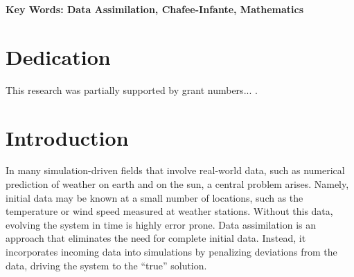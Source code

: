 \documentclass[12pt]{amsart}
\theoremstyle{plain}
\theoremstyle{definition}
\theoremstyle{remark}
\numberwithin{equation}{section} %
\numberwithin{figure}{section}   %
\begin{document}
\bfseries{Key Words:}
\normalfont
Data Assimilation, Chafee-Infante, Mathematics 
\newpage
{}

\section*{Dedication}\label{dedication}
This research was partially supported by grant numbers... .
\newpage
{}

\maketitle
\section{Introduction}\label{secInt}
\noindent
In many simulation-driven fields that involve real-world data, such as numerical prediction of weather on earth and on the sun, a central problem arises. Namely, initial data may be known at a small number of locations, such as the temperature or wind speed measured at weather stations. Without this data, evolving the system in time is highly error prone. Data assimilation is an approach that eliminates the need for complete initial data. Instead, it incorporates incoming data into simulations by penalizing deviations from the data, driving the system to the ``true'' solution.
\end{document}
